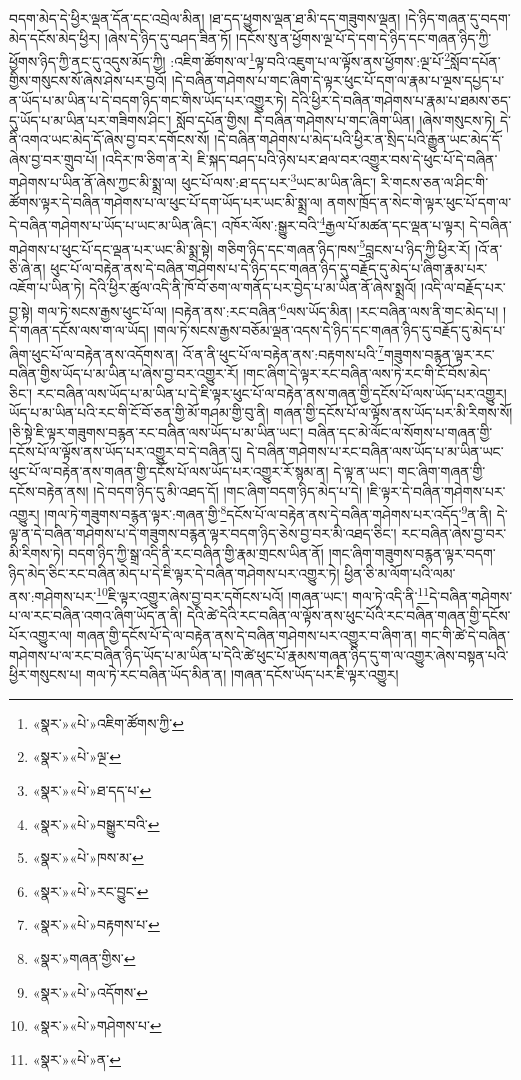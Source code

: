 བདག་མེད་དེ་ཕྱིར་ལྡན་དོན་དང་འབྲེལ་མིན། །ཐ་དད་ཕྱུགས་ལྡན་ཐ་མི་དད་གཟུགས་ལྡན། །དེ་ཉིད་གཞན་དུ་བདག་མེད་དངོས་མེད་ཕྱིར། །ཞེས་དེ་ཉིད་དུ་བཤད་ཟིན་ཏོ། །དངོས་སུ་ན་ཕྱོགས་ལྔ་པོ་དེ་དག་དེ་ཉིད་དང་གཞན་ཉིད་ཀྱི་ཕྱོགས་ཉིད་ཀྱི་ནང་དུ་འདུས་མོད་ཀྱི། :འཇིག་ཚོགས་ལ་\footnote{«སྣར་»«པེ་»འཇིག་ཚོགས་ཀྱི་}ལྟ་བའི་འཇུག་པ་ལ་ལྟོས་ནས་ཕྱོགས་:ལྔ་པོ་\footnote{«སྣར་»«པེ་»ལྔ་}སློབ་དཔོན་གྱིས་གསུངས་སོ་ཞེས་ཤེས་པར་བྱའོ། །དེ་བཞིན་གཤེགས་པ་གང་ཞིག་དེ་ལྟར་ཕུང་པོ་དག་ལ་རྣམ་པ་ལྔས་དཔྱད་པ་ན་ཡོད་པ་མ་ཡིན་པ་དེ་བདག་ཉིད་གང་གིས་ཡོད་པར་འགྱུར་ཏེ། དེའི་ཕྱིར་དེ་བཞིན་གཤེགས་པ་རྣམ་པ་ཐམས་ཅད་དུ་ཡོད་པ་མ་ཡིན་པར་གཟིགས་ཤིང་། སློབ་དཔོན་གྱིས། དེ་བཞིན་གཤེགས་པ་གང་ཞིག་ཡིན། །ཞེས་གསུངས་ཏེ། དེ་ནི་འགའ་ཡང་མེད་དོ་ཞེས་བྱ་བར་དགོངས་སོ། །དེ་བཞིན་གཤེགས་པ་མེད་པའི་ཕྱིར་ན་སྲིད་པའི་རྒྱུན་ཡང་མེད་དོ་ཞེས་བྱ་བར་གྲུབ་པོ། །འདིར་ཁ་ཅིག་ན་རེ། ཇི་སྐད་བཤད་པའི་ཉེས་པར་ཐལ་བར་འགྱུར་བས་དེ་ཕུང་པོ་དེ་བཞིན་གཤེགས་པ་ཡིན་ནོ་ཞེས་ཀྱང་མི་སྨྲ་ལ། ཕུང་པོ་ལས་:ཐ་དད་པར་\footnote{«སྣར་»«པེ་»ཐ་དད་པ་}ཡང་མ་ཡིན་ཞིང་། རི་གངས་ཅན་ལ་ཤིང་གི་ཚོགས་ལྟར་དེ་བཞིན་གཤེགས་པ་ལ་ཕུང་པོ་དག་ཡོད་པར་ཡང་མི་སྨྲ་ལ། ནགས་ཁྲོད་ན་སེང་གེ་ལྟར་ཕུང་པོ་དག་ལ་དེ་བཞིན་གཤེགས་པ་ཡོད་པ་ཡང་མ་ཡིན་ཞིང་། འཁོར་ལོས་:སྒྱུར་བའི་\footnote{«སྣར་»«པེ་»བསྒྱུར་བའི་}རྒྱལ་པོ་མཚན་དང་ལྡན་པ་ལྟར། དེ་བཞིན་གཤེགས་པ་ཕུང་པོ་དང་ལྡན་པར་ཡང་མི་སྨྲ་སྟེ། གཅིག་ཉིད་དང་གཞན་ཉིད་ཁས་\footnote{«སྣར་»«པེ་»ཁས་མ་}བླངས་པ་ཉིད་ཀྱི་ཕྱིར་རོ། །འོ་ན་ཅི་ཞེ་ན། ཕུང་པོ་ལ་བརྟེན་ནས་དེ་བཞིན་གཤེགས་པ་དེ་ཉིད་དང་གཞན་ཉིད་དུ་བརྗོད་དུ་མེད་པ་ཞིག་རྣམ་པར་འཇོག་པ་ཡིན་ཏེ། དེའི་ཕྱིར་ཚུལ་འདི་ནི་ཁོ་བོ་ཅག་ལ་གནོད་པར་བྱེད་པ་མ་ཡིན་ནོ་ཞེས་སྨྲའོ། །འདི་ལ་བརྗོད་པར་བྱ་སྟེ། གལ་ཏེ་སངས་རྒྱས་ཕུང་པོ་ལ། །བརྟེན་ནས་:རང་བཞིན་\footnote{«སྣར་»«པེ་»རང་བྱུང་}ལས་ཡོད་མིན། །རང་བཞིན་ལས་ནི་གང་མེད་པ། །དེ་གཞན་དངོས་ལས་ག་ལ་ཡོད། །གལ་ཏེ་སངས་རྒྱས་བཅོམ་ལྡན་འདས་དེ་ཉིད་དང་གཞན་ཉིད་དུ་བརྗོད་དུ་མེད་པ་ཞིག་ཕུང་པོ་ལ་བརྟེན་ནས་འདོགས་ན། འོ་ན་ནི་ཕུང་པོ་ལ་བརྟེན་ནས་:བརྟགས་པའི་\footnote{«སྣར་»«པེ་»བརྟགས་པ་}གཟུགས་བརྙན་ལྟར་རང་བཞིན་གྱིས་ཡོད་པ་མ་ཡིན་པ་ཞེས་བྱ་བར་འགྱུར་རོ། །གང་ཞིག་དེ་ལྟར་རང་བཞིན་ལས་ཏེ་རང་གི་ངོ་བོས་མེད་ཅིང་། རང་བཞིན་ལས་ཡོད་པ་མ་ཡིན་པ་དེ་ཇི་ལྟར་ཕུང་པོ་ལ་བརྟེན་ནས་གཞན་གྱི་དངོས་པོ་ལས་ཡོད་པར་འགྱུར། ཡོད་པ་མ་ཡིན་པའི་རང་གི་ངོ་བོ་ཅན་གྱི་མོ་གཤམ་གྱི་བུ་ནི། གཞན་གྱི་དངོས་པོ་ལ་ལྟོས་ནས་ཡོད་པར་མི་རིགས་སོ། །ཅི་སྟེ་ཇི་ལྟར་གཟུགས་བརྙན་རང་བཞིན་ལས་ཡོད་པ་མ་ཡིན་ཡང་། བཞིན་དང་མེ་ལོང་ལ་སོགས་པ་གཞན་གྱི་དངོས་པོ་ལ་ལྟོས་ནས་ཡོད་པར་འགྱུར་བ་དེ་བཞིན་དུ། དེ་བཞིན་གཤེགས་པ་རང་བཞིན་ལས་ཡོད་པ་མ་ཡིན་ཡང་ཕུང་པོ་ལ་བརྟེན་ནས་གཞན་གྱི་དངོས་པོ་ལས་ཡོད་པར་འགྱུར་རོ་སྙམ་ན། དེ་ལྟ་ན་ཡང་། གང་ཞིག་གཞན་གྱི་དངོས་བརྟེན་ནས། །དེ་བདག་ཉིད་དུ་མི་འཐད་དོ། །གང་ཞིག་བདག་ཉིད་མེད་པ་དེ། །ཇི་ལྟར་དེ་བཞིན་གཤེགས་པར་འགྱུར། །གལ་ཏེ་གཟུགས་བརྙན་ལྟར་:གཞན་གྱི་\footnote{«སྣར་»གཞན་གྱིས་}དངོས་པོ་ལ་བརྟེན་ནས་དེ་བཞིན་གཤེགས་པར་འདོད་\footnote{«སྣར་»«པེ་»འདོགས་}ན་ནི། དེ་ལྟ་ན་དེ་བཞིན་གཤེགས་པ་དེ་གཟུགས་བརྙན་ལྟར་བདག་ཉིད་ཅེས་བྱ་བར་མི་འཐད་ཅིང་། རང་བཞིན་ཞེས་བྱ་བར་མི་རིགས་ཏེ། བདག་ཉིད་ཀྱི་སྒྲ་འདི་ནི་རང་བཞིན་གྱི་རྣམ་གྲངས་ཡིན་ནོ། །གང་ཞིག་གཟུགས་བརྙན་ལྟར་བདག་ཉིད་མེད་ཅིང་རང་བཞིན་མེད་པ་དེ་ཇི་ལྟར་དེ་བཞིན་གཤེགས་པར་འགྱུར་ཏེ། ཕྱིན་ཅི་མ་ལོག་པའི་ལམ་ནས་:གཤེགས་པར་\footnote{«སྣར་»«པེ་»གཤེགས་པ་}ཇི་ལྟར་འགྱུར་ཞེས་བྱ་བར་དགོངས་པའོ། །གཞན་ཡང་། གལ་ཏེ་འདི་ནི་\footnote{«སྣར་»«པེ་»ན་}དེ་བཞིན་གཤེགས་པ་ལ་རང་བཞིན་འགའ་ཞིག་ཡོད་ན་ནི། དེའི་ཚེ་དེའི་རང་བཞིན་ལ་ལྟོས་ནས་ཕུང་པོའི་རང་བཞིན་གཞན་གྱི་དངོས་པོར་འགྱུར་ལ། གཞན་གྱི་དངོས་པོ་དེ་ལ་བརྟེན་ནས་དེ་བཞིན་གཤེགས་པར་འགྱུར་བ་ཞིག་ན། གང་གི་ཚེ་དེ་བཞིན་གཤེགས་པ་ལ་རང་བཞིན་ཉིད་ཡོད་པ་མ་ཡིན་པ་དེའི་ཚེ་ཕུང་པོ་རྣམས་གཞན་ཉིད་དུ་ག་ལ་འགྱུར་ཞེས་བསྟན་པའི་ཕྱིར་གསུངས་པ། གལ་ཏེ་རང་བཞིན་ཡོད་མིན་ན། །གཞན་དངོས་ཡོད་པར་ཇི་ལྟར་འགྱུར། 